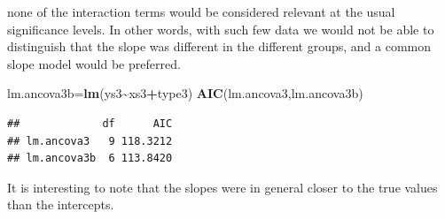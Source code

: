 \documentclass[
]{book}
\newenvironment{Shaded}{\begin{snugshade}}{\end{snugshade}}
\newcommand{\FunctionTok}[1]{\textcolor[rgb]{0.13,0.29,0.53}{\textbf{#1}}}
\newcommand{\NormalTok}[1]{#1}
\newcommand{\OtherTok}[1]{\textcolor[rgb]{0.56,0.35,0.01}{#1}}
\newcommand{\SpecialCharTok}[1]{\textcolor[rgb]{0.81,0.36,0.00}{\textbf{#1}}}
\begin{document}
none of the interaction terms would be considered relevant at the usual significance levels. In other words, with such few data we would not be able to distinguish that the slope was different in the different groups, and a common slope model would be preferred.

\begin{Shaded}
\begin{Highlighting}[]
\NormalTok{lm.ancova3b}\OtherTok{=}\FunctionTok{lm}\NormalTok{(ys3}\SpecialCharTok{\textasciitilde{}}\NormalTok{xs3}\SpecialCharTok{+}\NormalTok{type3)}
\FunctionTok{AIC}\NormalTok{(lm.ancova3,lm.ancova3b)}
\end{Highlighting}
\end{Shaded}

\begin{verbatim}
##             df      AIC
## lm.ancova3   9 118.3212
## lm.ancova3b  6 113.8420
\end{verbatim}

It is interesting to note that the slopes were in general closer to the true values than the intercepts.
\end{document}
